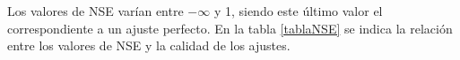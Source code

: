 Los valores de NSE varían entre $-\infty$ y 1, siendo este último valor el correspondiente a un ajuste perfecto.
En la tabla \ref{tablaNSE} se indica la relación entre los valores de NSE y la calidad de los ajustes.










